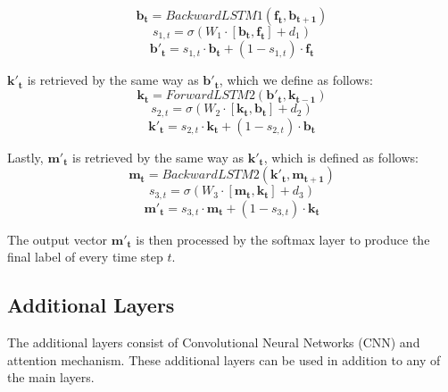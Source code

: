 \begin{equation}
\label{eq:backwardhighway1}
\mathbf{b_{t}} = BackwardLSTM1(\mathbf{f_{t}}, \mathbf{b_{t+1}})
\end{equation}
\begin{equation}
	s_{1,t} = \sigma(W_{1} \cdot [\mathbf{b_{t}}, \mathbf{f_{t}}] + d_{1})
\end{equation}
\begin{equation}
	\mathbf{b'_{t}} = s_{1,t} \cdot \mathbf{b_{t}} + (1 - s_{1,t}) \cdot \mathbf{f_{t}} 
\end{equation}

$\mathbf{k'_{t}}$ is retrieved by the same way as $\mathbf{b'_{t}}$, which we define as follows:
\begin{equation}
\label{eq:forwardhighway2}
\mathbf{k_{t}} = ForwardLSTM2(\mathbf{b'_{t}}, \mathbf{k_{t-1}})
\end{equation}
\begin{equation}
s_{2,t} = \sigma(W_{2} \cdot [\mathbf{k_{t}}, \mathbf{b_{t}}] + d_{2})
\end{equation}
\begin{equation}
\mathbf{k'_{t}} = s_{2,t} \cdot \mathbf{k_{t}} + (1 - s_{2,t}) \cdot \mathbf{b_{t}} 
\end{equation}

Lastly, $\mathbf{m'_{t}}$ is retrieved by the same way as $\mathbf{k'_{t}}$, which is defined as follows:
\begin{equation}
\label{eq:backwardhighway2}
\mathbf{m_{t}} = BackwardLSTM2(\mathbf{k'_{t}}, \mathbf{m_{t+1}})
\end{equation}
\begin{equation}
s_{3,t} = \sigma(W_{3} \cdot [\mathbf{m_{t}}, \mathbf{k_{t}}] + d_{3})
\end{equation}
\begin{equation}
\mathbf{m'_{t}} = s_{3,t} \cdot \mathbf{m_{t}} + (1 - s_{3,t}) \cdot \mathbf{k_{t}} 
\end{equation}

The output vector $\mathbf{m'_{t}}$ is then processed by the softmax layer to produce the final label of every time step $t$.

\subsection{Additional Layers}
The additional layers consist of Convolutional Neural Networks (CNN) and attention mechanism. These additional layers can be used in addition to any of the main layers.

